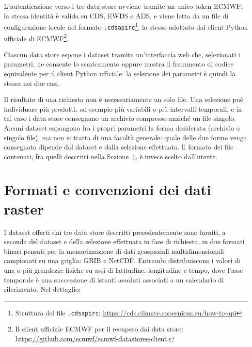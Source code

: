 L'autenticazione verso i tre data store avviene tramite un unico token \ac{ECMWF}:
la stessa identità è valida su \ac{CDS}, \ac{EWDS} e \ac{ADS}, e viene letta da un file di configurazione
locale nel formato \texttt{.cdsapirc}\footnote{Struttura del file \texttt{.cdsapirc}: \url{https://cds.climate.copernicus.eu/how-to-api}},
lo stesso adottato dal client Python ufficiale di \ac{ECMWF}\footnote{Il client ufficiale ECMWF per il recupero dai data store: \url{https://github.com/ecmwf/ecmwf-datastores-client}.}.

Ciascun data store espone i dataset tramite un'interfaccia web che, selezionati i parametri,
ne consente lo scaricamento oppure mostra il frammento di codice equivalente per il client
Python ufficiale: la selezione dei parametri è quindi la stessa nei due casi.

Il risultato di una richiesta non è necessariamente un solo file. Una selezione può
individuare più prodotti, ad esempio più variabili o più intervalli temporali, e in tal
caso i data store consegnano un archivio compresso anziché un file singolo. Alcuni dataset
espongono fra i propri parametri la forma desiderata (archivio o singolo file), ma non si tratta di una facoltà
generale: quale delle due forme venga consegnata dipende dal dataset e dalla selezione
effettuata. Il formato dei file contenuti, fra quelli descritti nella
Sezione~\ref{sec:formati-raster}, è invece scelto dall'utente.

\section{Formati e convenzioni dei dati raster}
\label{sec:formati-raster}

I dataset offerti dai tre data store descritti precedentemente sono forniti,
a seconda del dataset e della selezione effettuata in fase di richiesta, in due
formati binari pensati per la memorizzazione di dati geospaziali multidimensionali
campionati su una griglia: \ac{GRIB} e \ac{NetCDF}. Entrambi distribuiscono i valori
di una o più grandezze fisiche su assi di latitudine, longitudine e tempo, dove l'asse temporale
è una successione di istanti assoluti associati a un calendario di riferimento. Nel
dettaglio:

